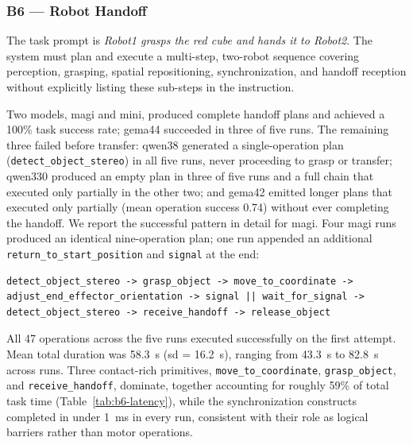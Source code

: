 \documentclass[
     12pt,
     a4paper,
     BCOR=10mm,
     DIV=14,
     listof=totoc,
     bibliography=totoc,
     parskip,
     twoside,
     headsepline
     ]{scrreprt}
\begin{document}
\subsubsection{B6 --- Robot Handoff}
The task prompt is \textit{Robot1 grasps the red cube and hands it to Robot2}. The system must plan and execute a multi-step, two-robot sequence covering perception, grasping, spatial repositioning, synchronization, and handoff reception without explicitly listing these sub-steps in the instruction.

Two models, \gls{magi} and \gls{mini}, produced complete handoff plans and achieved a 100\% task success rate; \gls{gema44} succeeded in three of five runs. The remaining three failed before transfer: \gls{qwen38} generated a single-operation plan (\texttt{detect\_object\_stereo}) in all five runs, never proceeding to grasp or transfer; \gls{qwen330} produced an empty plan in three of five runs and a full chain that executed only partially in the other two; and \gls{gema42} emitted longer plans that executed only partially (mean operation success 0.74) without ever completing the handoff. We report the successful pattern in detail for \gls{magi}. Four \gls{magi} runs produced an identical nine-operation plan; one run appended an additional \texttt{return\_to\_start\_position} and \texttt{signal} at the end:

\begin{lstlisting}
detect_object_stereo -> grasp_object -> move_to_coordinate -> adjust_end_effector_orientation -> signal || wait_for_signal -> detect_object_stereo -> receive_handoff -> release_object
\end{lstlisting}

All 47 operations across the five runs executed successfully on the first attempt. Mean total duration was 58.3~s (\gls{sd} = 16.2~s), ranging from 43.3~s to 82.8~s across runs. Three contact-rich primitives, \texttt{move\_to\_coordinate}, \texttt{grasp\_object}, and \texttt{receive\_handoff}, dominate, together accounting for roughly 59\% of total task time (Table~\ref{tab:b6-latency}), while the synchronization constructs completed in under 1~ms in every run, consistent with their role as logical barriers rather than motor operations.
\end{document}
